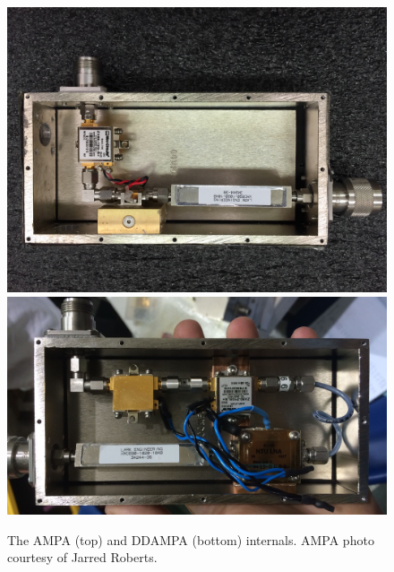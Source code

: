 \begin{figure}
\centering
	\includegraphics[height=0.45\textheight]{figures/AMPA}
	\includegraphics[height=0.45\textheight]{figures/DDAMPA}	
	\caption{The AMPA (top) and DDAMPA (bottom) internals.  AMPA photo courtesy of Jarred Roberts.}
	\label{fig:AMPAandDDAMPA}
\end{figure}	

